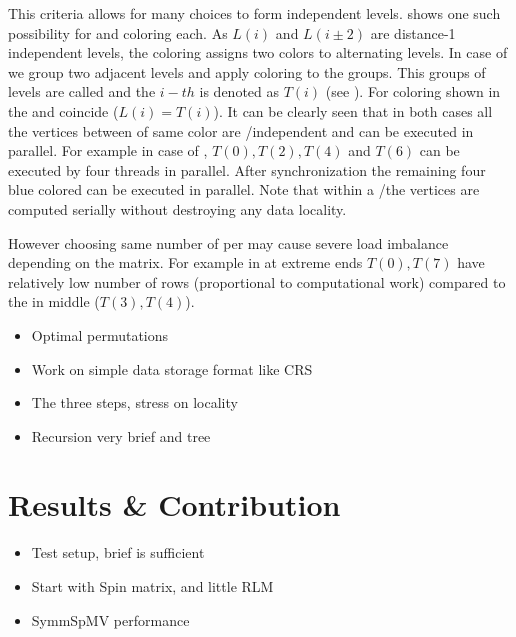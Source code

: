 This criteria allows for many choices to form \DK independent levels.  shows 
one such possibility for \DONE and \DTWO coloring each. As $L(i)$ and $L(i\pm2)$ are
distance-1 independent levels, the \DONE coloring  assigns
two colors to alternating levels.  In case of \DTWO we group two adjacent levels and apply \DONE
coloring to the groups. This groups of levels are called \levelGroups
 and the $i-th$ \levelGroup is denoted as $T(i)$ (see ).
For \DONE coloring shown in  the \levels and \levelGroups
coincide ($L(i) = T(i)$).
It can be clearly seen that in both cases
 all the vertices  between \levelGroups of same color
  are \DONE/\DTWO independent  and can be executed in parallel.
   For example in case of \DTWO, \levelGroups $T(0), T(2), T(4)$
 and $T(6)$ can be executed by four threads in parallel. After synchronization the remaining 
 four blue colored \levelGroups can be executed in parallel. Note that
 within a \levelGroup/\level the vertices are computed serially without destroying
 any data locality.

However choosing same number of \levels per \levelGroup may cause severe
load imbalance depending on the matrix. For example in  
 \levelGroups at extreme ends $T(0), T(7)$  have relatively low number of 
 rows (proportional to computational work)  compared to the \levelGroups in middle ($T(3),T(4)$).



\begin{itemize}
	\item Optimal permutations
	\item Work on simple data storage format like \acrshort{CRS}
	\item The three steps, stress on locality
	\item Recursion very brief and tree
\end{itemize}


\section{Results \& Contribution} \label{sec:results}
\begin{itemize}
	\item Test setup, brief is sufficient
	\item Start with Spin matrix, and little RLM
	\item SymmSpMV performance
\end{itemize}


